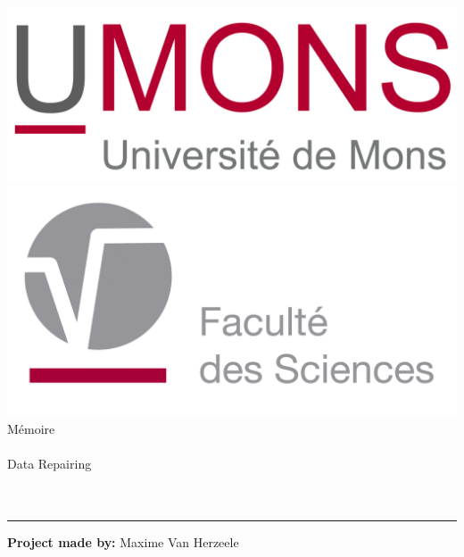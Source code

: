 \documentclass[letterpaper, 12pt]{report}
\begin{document}
\begin{titlepage}

\noindent


\begin{center}
\includegraphics[scale=0.2]{umonslogo}\\
\vspace*{0.7cm}
\includegraphics[scale=0.32]{fs-logo}\\
\vspace*{2.5cm}
\titlefont Mémoire\\~\\{\LARGE  Data Repairing\\}~\\~\\{\large} \par
\end{center}
\vspace*{3.5cm}
\hfill
\begin{minipage}{0.18\linewidth}
  \begin{flushright}
   \rule{0.5pt}{75pt}
  \end{flushright}
\end{minipage}
\begin{minipage}{0.8\linewidth}
\begin{flushleft}
\textsf{\textbf{Project made by:}} Maxime Van Herzeele\\

\end{flushleft}
\end{minipage}
\end{titlepage}
\end{document}
